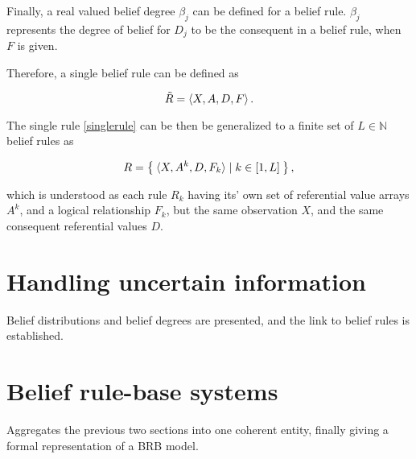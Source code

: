 Finally, a real valued belief degree $\beta_j$ can be defined for a belief rule. $\beta_j$ represents the degree of belief for $D_j$ to be the consequent
in a belief rule, when $F$ is given.

Therefore, a single belief rule can be defined as

\begin{equation}
\label{singlerule}
    \tilde{R} = \braket{X, A, D, F}{}.
\end{equation}

The single rule \eqref{singlerule} can be then be generalized to a finite set of $L \in \mathbb{N}$ belief rules as

\begin{equation}
    R = \Set{ \braket{X, A^k, D, F_k} \mid k \in \left[1, L \right]},
\end{equation}

which is understood as each rule $R_k$ having its' own set of referential value arrays $A^k$, and a logical relationship $F_k$, but the same observation $X$, and
the same consequent referential values $D$.




\section{Handling uncertain information}
{\color{red}
Belief distributions and belief degrees are presented, and the link to belief rules is established.
}

\section{Belief rule-base systems}
{\color{red}
Aggregates the previous two sections into one coherent entity, finally giving a formal representation of a BRB model.
}

